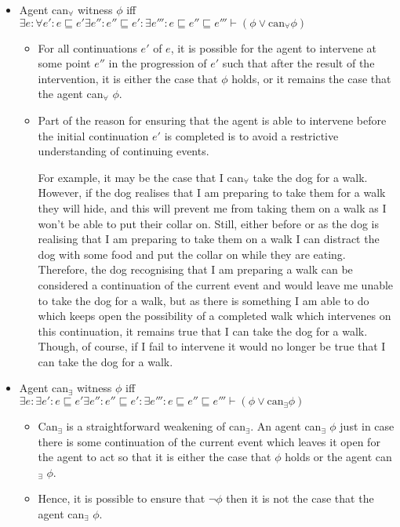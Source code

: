 \documentclass[10pt]{article}
\begin{document}
\begin{itemize}
\item Agent can\(_{\forall}\) witness \(\phi\) iff \(\exists e \colon\forall e' \colon e \sqsubseteq e' \exists e'' \colon e'' \sqsubseteq e' \colon \exists e''' \colon e \sqsubseteq e'' \sqsubseteq e''' \vdash (\phi \lor \text{can}_{\forall}\phi)\)
  \begin{itemize}
  \item For all continuations \(e'\) of \(e\), it is possible for the agent to intervene at some point \(e''\) in the progression of \(e'\) such that after the result of the intervention, it is either the case that \(\phi\) holds, or it remains the case that the agent can\(_{\forall}\) \(\phi\).
  \item Part of the reason for ensuring that the agent is able to intervene before the initial continuation \(e'\) is completed is to avoid a restrictive understanding of continuing events.

    For example, it may be the case that I can\(_{\forall}\) take the dog for a walk.
    However, if the dog realises that I am preparing to take them for a walk they will hide, and this will prevent me from taking them on a walk as I won't be able to put their collar on.
    Still, either before or as the dog is realising that I am preparing to take them on a walk I can distract the dog with some food and put the collar on while they are eating.
    Therefore, the dog recognising that I am preparing a walk can be considered a continuation of the current event and would leave me unable to take the dog for a walk, but as there is something I am able to do which keeps open the possibility of a completed walk which intervenes on this continuation, it remains true that I can take the dog for a walk.
    Though, of course, if I fail to intervene it would no longer be true that I can take the dog for a walk.
  \end{itemize}
\item Agent can\(_{\exists}\) witness \(\phi\) iff \(\exists e \colon\exists e' \colon e \sqsubseteq e' \exists e'' \colon e'' \sqsubseteq e' \colon \exists e''' \colon e \sqsubseteq e'' \sqsubseteq e''' \vdash (\phi \lor \text{can}_{\exists}\phi)\)
  \begin{itemize}
  \item Can\(_{\exists}\) is a straightforward weakening of can\(_{\exists}\).
    An agent can\(_{\exists}\) \(\phi\) just in case there is some continuation of the current event which leaves it open for the agent to act so that it is either the case that \(\phi\) holds or the agent can\(_{\exists}\) \(\phi\).
  \item Hence, it is possible to ensure that \(\lnot\phi\) then it is not the case that the agent can\(_{\exists}\) \(\phi\).
  \end{itemize}
\end{itemize}
\end{document}

